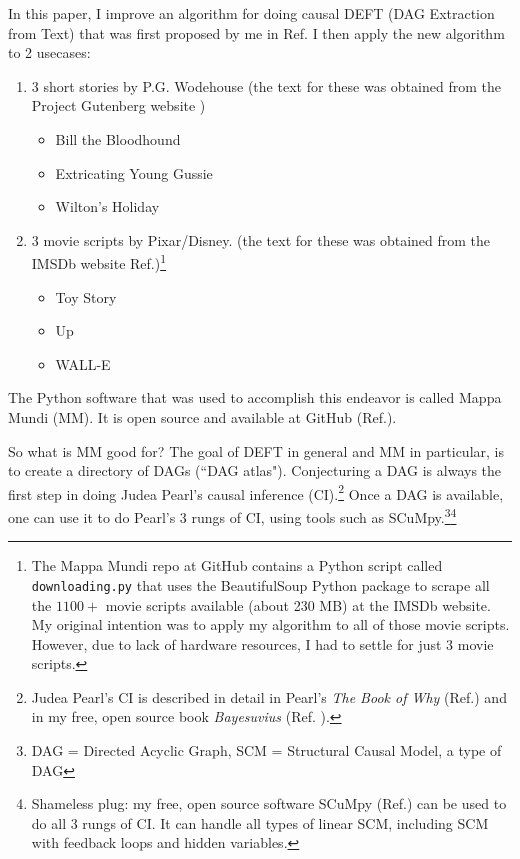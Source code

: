 \documentclass[12pt]{article}
\begin{document}
In this paper, I improve an algorithm
for doing causal DEFT (DAG Extraction from Text)
that was
first proposed by me in Ref.\cite{deft1}
I then apply the new algorithm to 2 usecases:
\begin{enumerate}

\item 3 short stories by P.G. Wodehouse
(the text for these was obtained from the
Project Gutenberg website \cite{project-gutenberg}) 

\begin{itemize}
\item  Bill the Bloodhound
\item  Extricating Young Gussie
\item Wilton's Holiday
\end{itemize}

\item 3 movie scripts by Pixar/Disney.
(the text for these was obtained from the IMSDb website Ref.\cite{imsdb})\footnote{The Mappa Mundi repo at GitHub
contains a Python script called {\tt downloading.py}
that uses the BeautifulSoup Python
package to scrape all the $1100+$ movie
scripts available (about 230 MB) at the IMSDb website.
My original intention
was to apply my algorithm to 
all of those movie scripts.
However, due to lack of
hardware resources, I had to 
settle for just 3 movie scripts.}

\begin{itemize}
\item Toy Story 
\item Up
\item WALL-E
\end{itemize}
\end{enumerate}

The Python 
software that was used to 
accomplish this endeavor is 
called Mappa Mundi (MM). It is open source and available
at GitHub (Ref.\cite{github-mappa-mundi}).



So what is MM good for? The goal of DEFT in general and MM in particular, is to create a directory 
of DAGs (``DAG atlas").
Conjecturing
a DAG is always the first step
in doing Judea Pearl's causal inference (CI).\footnote{Judea Pearl's CI is described
in detail in Pearl's {\it The Book of Why}
(Ref.\cite{book-of-why})
and in my free, open source book {\it Bayesuvius} (Ref. \cite{bayesuvius}).}
Once a DAG is available,
one can use it to 
do Pearl's 3 rungs of CI,
using tools such as SCuMpy.\footnote{DAG = Directed Acyclic Graph, SCM = Structural Causal Model, a type of DAG}\footnote{Shameless plug: my free, open source software
SCuMpy (Ref.\cite{scumpy})
can be used to do all 3 rungs
of CI. 
It can handle all types of linear SCM, including
SCM with feedback loops and hidden variables.} 
\end{document}
